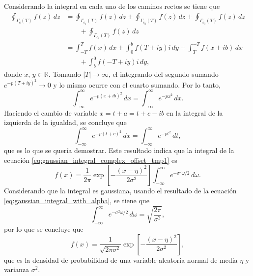 \documentclass[a4paper]{report}
\begin{document}
Considerando la integral en cada uno de los caminos rectos se tiene que
\begin{align*}
\oint_{\Gamma_c(T)} f(z)\,dz &= \oint_{\Gamma_{c_1}(T)} f(z)\,dz+\oint_{\Gamma_{c_2}(T)} f(z)\,dz+\oint_{\Gamma_{c_3}(T)} f(z)\,dz \\
 &\qquad+\oint_{\Gamma_{c_4}(T)} f(z)\,dz \\
 &= \int_{-T}^{T}f(x)\,dx + \int_{0}^{b}f(T+iy)i\,dy + \int_{T}^{-T}f(x+ib)\,dx \\
 &\qquad + \int_{b}^{0}f(-T+iy)i\,dy,
\end{align*}
donde \(x,\,y\in\mathbb{R}\). Tomando \(|T|\to \infty\), el integrando del segundo sumando \(e^{-p(T+iy)^2}\to 0\) y lo mismo ocurre con el cuarto sumando. Por lo tanto,
\[
 \int_{-\infty}^{\infty}e^{-p(x+ib)^2}\,dx = \int_{-\infty}^{\infty}e^{-px^2}\,dx.
\]
Haciendo el cambio de variable \(x=t+a=t+c-ib\) en la integral de la izquierda de la igualdad, se concluye que
\[
 \int_{-\infty}^{\infty}e^{-p(t+c)^2}\,dx = \int_{-\infty}^{\infty}e^{-pt^2}\,dt,
\]
que es lo que se quería demostrar.
Este resultado indica que la integral de la ecuación \ref{eq:gaussian_integral_complex_offset_tmp1}  es
\[
 f(x)=\frac{1}{2\pi}\exp\left[-\frac{(x-\eta)^2}{2\sigma^2}\right]\int_{-\infty}^{\infty}e^{-\sigma^2\omega/2}\,d\omega.
\]
Considerando que la integral es gaussiana, usando el resultado de la ecuación \ref{eq:gaussian_integral_with_alpha}, se tiene que
\[
 \int_{-\infty}^{\infty}e^{-\sigma^2\omega/2}\,d\omega =  \sqrt{\frac{2\pi}{\sigma^2}},
\]
por lo que se concluye que
\[
 f(x)=\frac{1}{\sqrt{2\pi\sigma^2}}\exp\left[-\frac{(x-\eta)^2}{2\sigma^2}\right],
\]
que es la densidad de probabilidad de una variable aleatoria normal de media \(\eta\) y varianza \(\sigma^2\).
\end{document}

